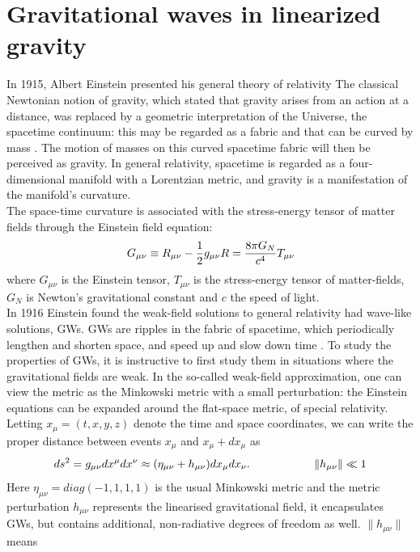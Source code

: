 \documentclass[binding=0.6cm, LaM]{sapthesis}
\begin{document}
\section{Gravitational waves in linearized gravity}

	In 1915, Albert Einstein presented his general theory of relativity
	The classical Newtonian notion of gravity, which stated that gravity arises from an 
	action at a distance, was replaced by a geometric interpretation of the Universe, 
	the spacetime continuum: this may be regarded as a fabric and that can be curved 
	by mass \cite{1}. 
	The motion of masses on this curved spacetime fabric will then be perceived as gravity. 
	In general relativity, spacetime is regarded as a four-dimensional manifold 
	with a Lorentzian metric, and gravity is a manifestation of the manifold’s curvature. \\
	The space-time curvature is associated with the stress-energy tensor 
	of matter fields through the Einstein field equation:
		\begin{equation}
		G_{\mu\nu} \equiv R_{\mu\nu}  - {1 \over 2}g_{\mu\nu}R = {8\pi G_{N} \over {c^4}}T_{\mu\nu} 
		\end{equation}
	where $G_{\mu\nu} $ is the Einstein tensor, $T_{\mu\nu} $ is the stress-energy 
	tensor of matter-fields, $ G_{N}$ is Newton’s gravitational constant and $c$ the speed of light. \\
	In 1916 Einstein found the weak-field solutions to general relativity had wave-like solutions, GWs.
	GWs are ripples in the fabric of spacetime, 
	which periodically lengthen and shorten space, and speed up and slow down time \cite{2}.
 	To study the properties of GWs, it is instructive to first study them 
	in situations where the gravitational fields are weak.
	In the so-called weak-field approximation, one can view the metric as the Minkowski metric 
	with a small perturbation: the Einstein equations can be expanded around the flat-space metric, of special relativity. \\
	Letting $ x_\mu = (t, x, y, z)$ denote the time and space coordinates, 
	we can write the proper distance between events $x_{\mu}$ and $x_{\mu} + dx_{\mu}$ as
		\[
		ds^2 = g_{\mu\nu}dx^{\mu}dx^{\nu} \approx (\eta_{\mu\nu} + h_{\mu\nu})dx_{\mu}dx_{\nu}. \hspace*{2cm}\|h_{\mu\nu}\|\ll 1
		\]
	Here $\eta_{\mu\nu} = diag(-1,1,1,1)$ is the usual Minkowski metric and the metric perturbation  $h_{\mu\nu}$        
	represents the linearised gravitational field, it encapsulates GWs, 
	but contains additional, non-radiative degrees of freedom as well. $\|h_{\mu\nu}\|$ means
\end{document}
